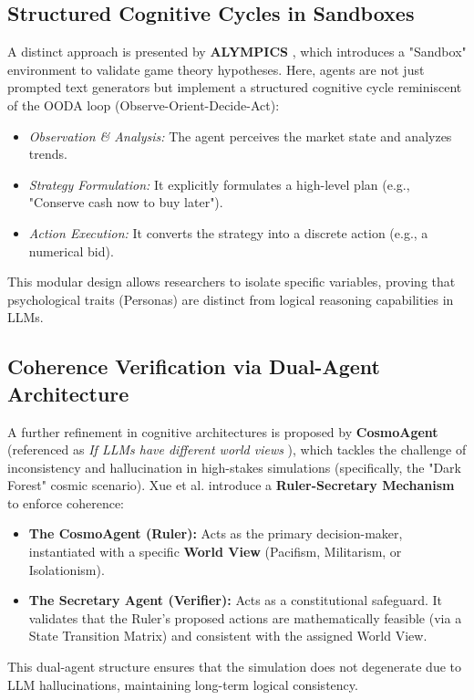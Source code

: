 \subsection{Structured Cognitive Cycles in Sandboxes}
A distinct approach is presented by \textbf{ALYMPICS} \cite{mao2023alympics}, which introduces a "Sandbox" environment to validate game theory hypotheses. Here, agents are not just prompted text generators but implement a structured cognitive cycle reminiscent of the OODA loop (Observe-Orient-Decide-Act):
\begin{itemize}
    \item \textit{Observation \& Analysis:} The agent perceives the market state and analyzes trends.
    \item \textit{Strategy Formulation:} It explicitly formulates a high-level plan (e.g., "Conserve cash now to buy later").
    \item \textit{Action Execution:} It converts the strategy into a discrete action (e.g., a numerical bid).
\end{itemize}
This modular design allows researchers to isolate specific variables, proving that psychological traits (Personas) are distinct from logical reasoning capabilities in LLMs.

\subsection{Coherence Verification via Dual-Agent Architecture}
A further refinement in cognitive architectures is proposed by \textbf{CosmoAgent} (referenced as \textit{If LLMs have different world views} \cite{xue2024if}), which tackles the challenge of inconsistency and hallucination in high-stakes simulations (specifically, the "Dark Forest" cosmic scenario). Xue et al. introduce a \textbf{Ruler-Secretary Mechanism} to enforce coherence:
\begin{itemize}
    \item \textbf{The CosmoAgent (Ruler):} Acts as the primary decision-maker, instantiated with a specific \textbf{World View} (Pacifism, Militarism, or Isolationism).
    \item \textbf{The Secretary Agent (Verifier):} Acts as a constitutional safeguard. It validates that the Ruler's proposed actions are mathematically feasible (via a State Transition Matrix) and consistent with the assigned World View.
\end{itemize}
This dual-agent structure ensures that the simulation does not degenerate due to LLM hallucinations, maintaining long-term logical consistency.

